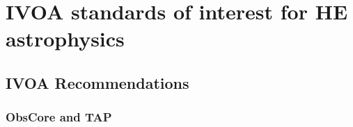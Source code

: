 \documentclass[11pt,a4paper]{ivoa}
\begin{document}
{%
%
%
%
%


\section{{IVOA} standards of interest for {HE} astrophysics}

\subsection{{IVOA} Recommendations}
\label{sec:vorecs}

\subsubsection{ObsCore and TAP}
\label{sec:vorecs_obscore}

}
\end{document}
